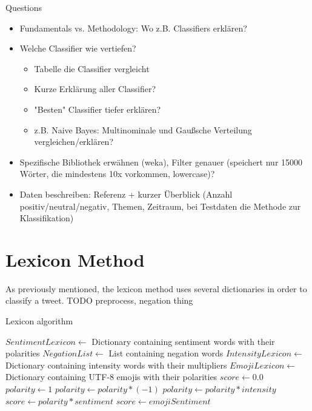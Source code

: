 Questions
\begin{itemize}
    \item Fundamentals vs. Methodology: Wo z.B. Classifiers erklären?
    \item Welche Classifier wie vertiefen?
    \begin{itemize}
    \item Tabelle die Classifier vergleicht
    \item Kurze Erklärung aller Classifier?
    \item "Besten" Classifier tiefer erklären?
    \item z.B. Naive Bayes: Multinominale und Gaußsche Verteilung vergleichen/erklären?
    \end{itemize}
    \item Spezifische Bibliothek erwähnen (weka), Filter genauer (speichert nur 15000 Wörter, die mindestens 10x vorkommen, lowercase)?
    \item Daten beschreiben: Referenz + kurzer Überblick (Anzahl positiv/neutral/negativ, Themen, Zeitraum, bei Testdaten die Methode zur Klassifikation)
\end{itemize}

\section{Lexicon Method}
As previously mentioned, the lexicon method uses several dictionaries in order to classify a tweet. 
TODO preprocess, negation thing
\begin{algorithm}[H]
  \caption{Lexicon algorithm}\label{euclid}
\begin{algorithmic}[1]
\State $SentimentLexicon \gets$ Dictionary containing sentiment words with their polarities
\State $NegationList \gets$ List containing negation words
\State $IntensityLexicon \gets$ Dictionary containing intensity words with their multipliers
\State $EmojiLexicon \gets$ Dictionary containing UTF-8 emojis with their polarities
\State $score \gets 0.0$
    \State $polarity \gets 1$
            \State $polarity \gets polarity * (-1)$
        \Else
                \State $polarity \gets polarity * intensity$
            \EndIf
        \EndIf
    \EndFor
    \State $score \gets polarity * sentiment$
\Else
        \State $score \gets emojiSentiment$
    \EndIf
\EndIf 
\EndFor
    \EndProcedure
\end{algorithmic}
\end{algorithm}




